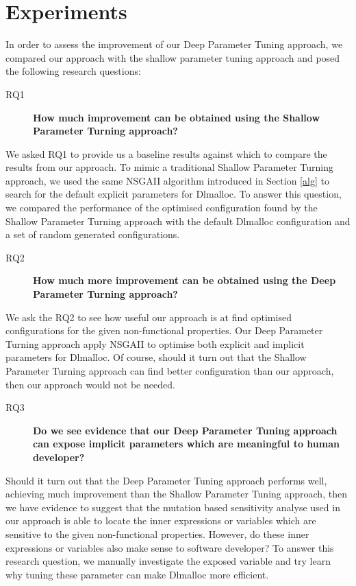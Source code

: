
\section{Experiments}

In order to assess the improvement of our Deep Parameter Tuning approach, we compared our approach with the shallow parameter tuning approach and posed the following research questions: 
 

\begin{description}
 \item[RQ1] {\bf How much improvement can be obtained using the Shallow Parameter Turning approach? }
\end{description}

We asked RQ1 to provide us a baseline results against which to compare the results from our approach. To mimic a traditional Shallow Parameter Turning approach, we used the same NSGAII algorithm introduced in Section \ref{alg} to search for the default explicit parameters for Dlmalloc. To answer this question, we compared the performance of the optimised configuration found by the Shallow Parameter Turning approach with the default Dlmalloc configuration and a set of random generated configurations.  %

\begin{description}
\item[RQ2] {\bf How much more improvement can be obtained using the Deep Parameter Turning approach? }
\end{description}

We ask the RQ2 to see how useful our approach is at find optimised configurations for the given non-functional properties. Our Deep Parameter Turning approach apply NSGAII to optimise both explicit and implicit parameters for Dlmalloc. Of course, should it turn out that the Shallow Parameter Turning approach can find better configuration than our approach, then our approach would not be needed. 

\begin{description}
\item[RQ3] {\bf Do we see evidence that our Deep Parameter Tuning approach can expose implicit parameters which are meaningful to human developer? }
\end{description} 

Should it turn out that the Deep Parameter Tuning approach performs well, achieving much improvement than the Shallow Parameter Tuning approach, then we have evidence to suggest that the mutation based sensitivity analyse used in our approach is able to locate the inner expressions or variables which are sensitive to the given non-functional properties. However, do these inner expressions or variables also make sense to software developer? To answer this research question, we manually investigate the exposed variable and try learn why tuning these parameter can make Dlmalloc more efficient.  

